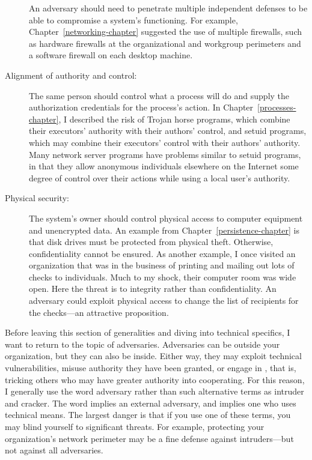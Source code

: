 \begin{description}
An adversary should need to penetrate multiple
independent defenses to be able to compromise a system's functioning.
For example, Chapter~\ref{networking-chapter} suggested the use of
multiple firewalls, such as hardware firewalls at the organizational
and workgroup perimeters and a software firewall on each desktop
machine.
\item[Alignment of authority and control:]
The same person should control
what a process will do and supply the authorization credentials for
the process's action.  In Chapter~\ref{processes-chapter}, I described
the risk of Trojan horse programs, which combine their executors'
authority with their authors' control, and setuid programs, which may
combine their executors' control with their authors' authority.  Many
network server programs have problems similar to setuid programs, in
that they allow anonymous individuals elsewhere on the Internet some
degree of control over their actions while using a local user's
authority.
\item[Physical security:]
The system's owner should control physical access to computer equipment and
unencrypted data.
An example from Chapter~\ref{persistence-chapter} is that disk drives
must be protected from physical theft.
Otherwise, confidentiality cannot be ensured.  As another example, I
once visited an organization that was in the business of printing and mailing out lots of checks
to individuals.  Much to my shock, their computer room was wide open.
Here the threat is to integrity rather than confidentiality.  An
adversary could exploit physical access to change the list of
recipients for the checks---an attractive proposition.
\end{description}

Before leaving this section of generalities and diving into technical
specifics, I want to return to the topic of adversaries.  Adversaries
can be outside your organization, but they can also be inside.  Either
way, they may exploit technical vulnerabilities, misuse authority they
have been granted, or engage in , that is,
tricking others who may have greater authority into cooperating. For
this reason, I generally use the word adversary rather than such
alternative terms as intruder and cracker.  The word  implies
an external adversary, and  implies one who uses technical
means.  The largest danger is that if you use one of these terms, you
may blind yourself to significant threats.  For example, protecting
your organization's network perimeter may be a fine defense against
intruders---but not against all adversaries.


